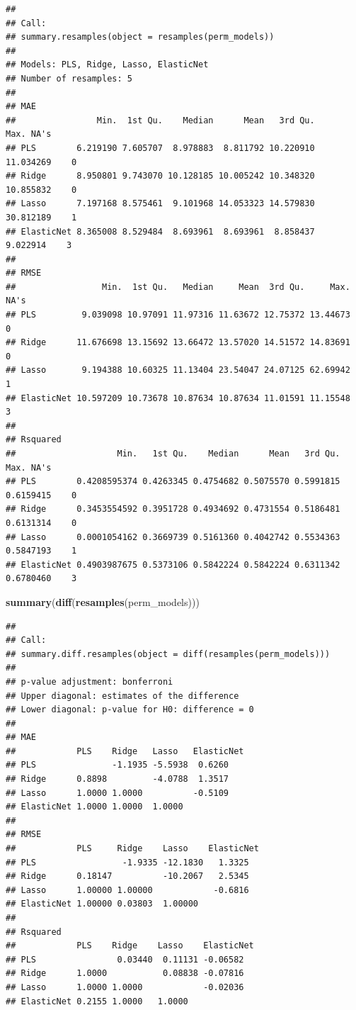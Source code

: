 \documentclass[
  11pt,
]{article}
\newenvironment{Shaded}{\begin{snugshade}}{\end{snugshade}}
\newcommand{\FunctionTok}[1]{\textcolor[rgb]{0.13,0.29,0.53}{\textbf{#1}}}
\newcommand{\NormalTok}[1]{#1}
\begin{document}
\begin{verbatim}
## 
## Call:
## summary.resamples(object = resamples(perm_models))
## 
## Models: PLS, Ridge, Lasso, ElasticNet 
## Number of resamples: 5 
## 
## MAE 
##                Min.  1st Qu.    Median      Mean   3rd Qu.      Max. NA's
## PLS        6.219190 7.605707  8.978883  8.811792 10.220910 11.034269    0
## Ridge      8.950801 9.743070 10.128185 10.005242 10.348320 10.855832    0
## Lasso      7.197168 8.575461  9.101968 14.053323 14.579830 30.812189    1
## ElasticNet 8.365008 8.529484  8.693961  8.693961  8.858437  9.022914    3
## 
## RMSE 
##                 Min.  1st Qu.   Median     Mean  3rd Qu.     Max. NA's
## PLS         9.039098 10.97091 11.97316 11.63672 12.75372 13.44673    0
## Ridge      11.676698 13.15692 13.66472 13.57020 14.51572 14.83691    0
## Lasso       9.194388 10.60325 11.13404 23.54047 24.07125 62.69942    1
## ElasticNet 10.597209 10.73678 10.87634 10.87634 11.01591 11.15548    3
## 
## Rsquared 
##                    Min.   1st Qu.    Median      Mean   3rd Qu.      Max. NA's
## PLS        0.4208595374 0.4263345 0.4754682 0.5075570 0.5991815 0.6159415    0
## Ridge      0.3453554592 0.3951728 0.4934692 0.4731554 0.5186481 0.6131314    0
## Lasso      0.0001054162 0.3669739 0.5161360 0.4042742 0.5534363 0.5847193    1
## ElasticNet 0.4903987675 0.5373106 0.5842224 0.5842224 0.6311342 0.6780460    3
\end{verbatim}

\begin{Shaded}
\begin{Highlighting}[]
\FunctionTok{summary}\NormalTok{(}\FunctionTok{diff}\NormalTok{(}\FunctionTok{resamples}\NormalTok{(perm\_models)))}
\end{Highlighting}
\end{Shaded}

\begin{verbatim}
## 
## Call:
## summary.diff.resamples(object = diff(resamples(perm_models)))
## 
## p-value adjustment: bonferroni 
## Upper diagonal: estimates of the difference
## Lower diagonal: p-value for H0: difference = 0
## 
## MAE 
##            PLS    Ridge   Lasso   ElasticNet
## PLS               -1.1935 -5.5938  0.6260   
## Ridge      0.8898         -4.0788  1.3517   
## Lasso      1.0000 1.0000          -0.5109   
## ElasticNet 1.0000 1.0000  1.0000            
## 
## RMSE 
##            PLS     Ridge    Lasso    ElasticNet
## PLS                 -1.9335 -12.1830   1.3325  
## Ridge      0.18147          -10.2067   2.5345  
## Lasso      1.00000 1.00000            -0.6816  
## ElasticNet 1.00000 0.03803  1.00000            
## 
## Rsquared 
##            PLS    Ridge    Lasso    ElasticNet
## PLS                0.03440  0.11131 -0.06582  
## Ridge      1.0000           0.08838 -0.07816  
## Lasso      1.0000 1.0000            -0.02036  
## ElasticNet 0.2155 1.0000   1.0000
\end{verbatim}
\end{document}
